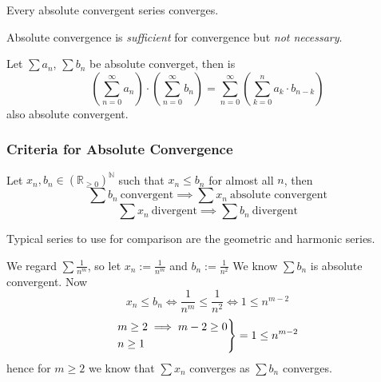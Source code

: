\begin{theorem}
   Every absolute convergent series converges.
\end{theorem}
\begin{remark}
   Absolute convergence is \emph{sufficient} for convergence but \emph{not necessary}.
\end{remark}

\begin{theorem}
   Let \(\sum a_n\), \(\sum b_n\) be absolute converget, then is
   \[\left(\sum_{n=0}^\infty a_n\right) \cdot \left(\sum_{n=0}^\infty b_n\right) = \sum_{n=0}^\infty\left(\sum_{k=0}^n a_k \cdot b_{n - k}\right)\]
   also absolute convergent.
\end{theorem}

\newpage

\subsubsection{Criteria for Absolute Convergence}
\begin{proposition}\label{pro:comparison_test}
   Let \(x_n, b_n \in (\mathbb{R}_{\geq 0})^\mathbb{N}\) such that \(x_n \leq b_n\) for almost all \(n\), then
   \[\sum b_n~\text{convergent} \implies \sum x_n~\text{absolute convergent}\]
   \[\sum x_n~\text{divergent} \implies \sum b_n~\text{divergent}\]
\end{proposition}
\begin{remark}
   Typical series to use for comparison are the geometric and harmonic series.
\end{remark}
\begin{example}
   We regard \(\sum \frac{1}{n^m}\), so let \(x_n := \frac{1}{n^m}\) and \(b_n := \frac{1}{n^2}\)
   We know \(\sum b_n\) is absolute convergent.
   Now
   \[x_n \leq b_n \iff \frac{1}{n^m} \leq \frac{1}{n^2} \iff 1 \leq n^{m-2}\]
   \[\begin{drcases}m \geq 2 \implies m-2 \geq 0\\n \geq 1\end{drcases} = 1 \leq n^{m-2}\]
   hence for \(m \geq 2\) we know that \(\sum x_n\) converges as \(\sum b_n\) converges.
\end{example}

